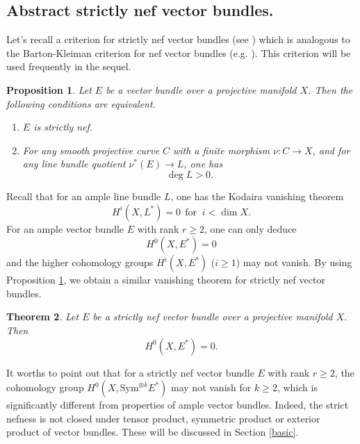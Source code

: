 \documentclass[english,reqno]{amsart}
\theoremstyle{plain}
\newtheorem{thm}{Theorem}[section]
\newtheorem{prop}[thm]{Proposition}
\theoremstyle{definition}
\numberwithin{equation}{section} %
\begin{document}
\subsection{Abstract strictly nef vector bundles.} Let's recall a criterion for
 strictly nef vector bundles (see \cite[Proposition 2.1]{LiOuYang2019})  which is analogous to the Barton-Kleiman criterion for nef vector bundles (e.g. \cite[Proposition ~6.1.18]{Lazarsfeld2004a}). This criterion will be used frequently in the sequel.

 \begin{prop}\label{cri0} Let $E$ be a vector bundle over a projective manifold $X$. Then the following conditions are equivalent.
    \begin{enumerate}
        \item[(1)] $E$ is  strictly nef.

        \item[(2)] For any    smooth projective curve $C$ with a  finite morphism $\nu:C\rightarrow X$,  and for any line bundle quotient $\nu^*(E)\to L$, one has $$ \deg L>0.  $$

    \end{enumerate}

 \end{prop}

 \noindent Recall that for an ample line bundle $L$, one has the Kodaira vanishing theorem
 $$H^i(X,L^*)=0\ \  \text{for\ }\  i<\dim X.$$
 For an ample vector bundle $E$ with rank $r\geq 2$, one can only deduce $$H^0(X,E^*)=0$$ and the higher cohomology groups $H^i(X,E^*)$ ($i\geq 1$) may not  vanish.
 By using Proposition \ref{cri0}, we obtain a similar vanishing theorem  for strictly nef vector bundles.


 \begin{thm} Let $E$ be a strictly nef vector bundle over a projective manifold $X$. Then $$H^0(X,E^*)=0.$$
 \end{thm}


\noindent It worths to point out that for a strictly nef vector bundle $E$ with rank $r\geq 2$, the cohomology group $H^0(X,\mathrm{Sym}^{\otimes k} E^*)$ may not vanish for $k\geq 2$, which is significantly different from properties of ample vector bundles. Indeed, the strict nefness is not closed under tensor product, symmetric product or exterior product of vector bundles. These will be discussed in Section \ref{basic}.\\
\end{document}
